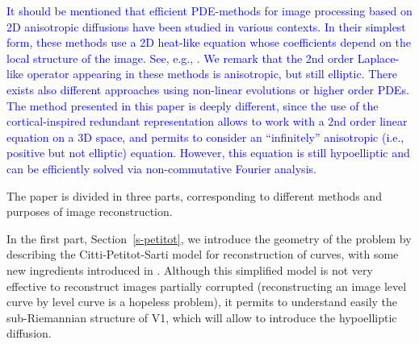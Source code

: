 \documentclass[proc]{edpsmath}
\begin{document}
\textcolor{blue}{
It should be mentioned that efficient PDE-methods for image processing based on 2D anisotropic diffusions have been studied in various contexts. 
In their simplest form, these methods use a 2D heat-like equation whose coefficients depend on the local structure of the image.  See, e.g., \cite{GWWBBS,Tschum}. 
We remark that the 2nd order Laplace-like operator appearing in these methods is anisotropic, but still elliptic.
There exists also different approaches using non-linear evolutions or higher order PDEs.
The method presented in this paper is deeply different, since the use of the cortical-inspired redundant representation allows to work with a 2nd order linear equation on a 3D space, and permits to consider an ``infinitely'' anisotropic (i.e., positive but not elliptic) equation. However, this equation is still hypoelliptic and can be efficiently solved via non-commutative Fourier analysis.}

The paper is divided in three parts, corresponding to different methods and purposes of image reconstruction.

In the first part, Section~\ref{s-petitot}, we introduce the geometry of the problem by describing the Citti-Petitot-Sarti model for reconstruction of curves, with some new ingredients introduced in \cite{Boscain2012a}. Although this simplified model is not very effective to reconstruct images partially corrupted (reconstructing an image level curve by level curve is a hopeless problem), it permits to understand easily the sub-Riemannian structure of V1, which will allow to introduce the hypoelliptic diffusion.

\end{document}
